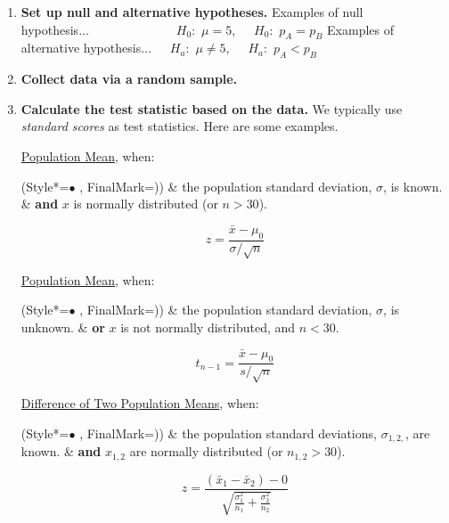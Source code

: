 \begin{enumerate}
\item
\textbf{Set up null and alternative hypotheses.}
\newline
Examples of null hypothesis...~~~~~~~~~~~~~~$H_0$:~$\mu = 5$,~~~$H_0$:~$p_A = p_B$
\newline
Examples of alternative hypothesis...~~~$H_a$:~$\mu \neq 5$,~~~$H_a$:~$p_A < p_B$
\item
\textbf{Collect data via a random sample.}
\item
\textbf{Calculate the test statistic based on the data.}
\newline
We typically use \textit{standard scores} as test statistics.
Here are some examples.

\underline{Population Mean}, when:
\begin{easylist}[itemize]
\ListProperties(Style*=$\bullet$ , FinalMark={)})
\vspace{-2.0mm}
& the population standard deviation, $\sigma$, is known.
\vspace{-3.5mm}
& \textbf{and} $x$ is normally distributed (or $n>30$).
\end{easylist}
% 
\vspace{-5.0mm}
\begin{equation}
z = \frac{\bar{x} - \mu_0}{\sigma / \sqrt{n}}
\end{equation}

\underline{Population Mean}, when:
\begin{easylist}[itemize]
\ListProperties(Style*=$\bullet$ , FinalMark={)})
\vspace{-2.0mm}
& the population standard deviation, $\sigma$, is unknown.
\vspace{-3.5mm}
& \textbf{or} $x$ is not normally distributed, and $n < 30$.
\end{easylist}
% 
\vspace{-5.0mm}
\begin{equation}
t_{n-1} = \frac{\bar{x} - \mu_0}{s / \sqrt{n}}
\end{equation}

\underline{Difference of Two Population Means}, when:
\begin{easylist}[itemize]
\ListProperties(Style*=$\bullet$ , FinalMark={)})
\vspace{-2.0mm}
& the population standard deviations, $\sigma_{1,2,}$, are known.
\vspace{-3.5mm}
& \textbf{and} $x_{1,2}$ are normally distributed (or $n_{1,2}>30$).
\end{easylist}
% 
\vspace{-5.0mm}
\begin{equation}
z = \frac{(\bar{x}_1 - \bar{x}_2) - 0}{\sqrt{\frac{\sigma_1^2}{n_1} + \frac{\sigma_2^2}{n_2}}}
\end{equation}


\end{enumerate}
